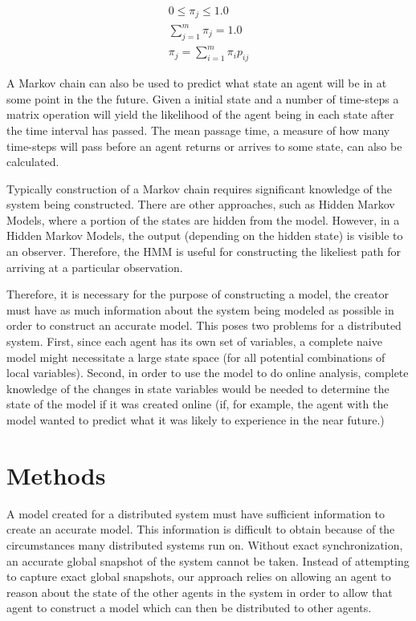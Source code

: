 \begin{align}
0\leq\pi_j\leq1.0 \\
\sum_{j = 1}^{m}\pi_j = 1.0 \\
\pi_j = \sum_{i=1}^{m} \pi_i p_{ij}
\end{align}

A Markov chain can also be used to predict what state an agent will be in at some point in the the future.
Given a initial state and a number of time-steps a matrix operation will yield the likelihood of the agent being in each state after the time interval has passed.
The mean passage time, a measure of how many time-steps will pass before an agent returns or arrives to some state, can also be calculated.

Typically construction of a Markov chain requires significant knowledge of the system being constructed. There are other approaches, such as Hidden Markov Models, where a portion of the states are hidden from the model. However, in a Hidden Markov Models, the output (depending on the hidden state) is visible to an observer. Therefore, the HMM is useful for constructing the likeliest path for arriving at a particular observation.

Therefore, it is necessary for the purpose of constructing a model, the creator must have as much information about the system being modeled as possible in order to construct an accurate model. This poses two problems for a distributed system. First, since each agent has its own set of variables, a complete naive model might necessitate a large state space (for all potential combinations of local variables). Second, in order to use the model to do online analysis, complete knowledge of the changes in state variables would be needed to determine the state of the model if it was created online (if, for example, the agent with the model wanted to predict what it was likely to experience in the near future.)


\section{Methods}

A model created for a distributed system must have sufficient information to create an accurate model. This information is difficult to obtain because of the circumstances many distributed systems run on. Without exact synchronization, an accurate global snapshot of the system cannot be taken. Instead of attempting to capture exact global snapshots, our approach relies on allowing an agent to reason about the state of the other agents in the system in order to allow that agent to construct a model which can then be distributed to other agents.

